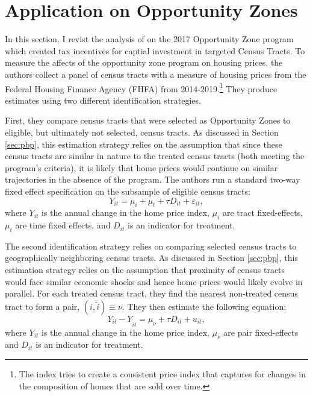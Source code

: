 \documentclass[11pt]{article}
\begin{document}
\section{Application on Opportunity Zones}\label{sec:oz}

In this section, I revist the analysis of \citet{Chen_Glaeser_Wessel_2021} on the 2017 Opportunity Zone program which created tax incentives for captial investment in targeted Census Tracts. To measure the affects of the opportunity zone program on housing prices, the authors collect a panel of census tracts with a measure of housing prices from the Federal Housing Finance Agency (FHFA) from 2014-2019.\footnote{The index tries to create a consistent price index that captures for changes in the composition of homes that are sold over time.} They produce estimates using two different identification strategies.

First, they compare census tracts that were selected as Opportunity Zones to eligible, but ultimately not selected, census tracts. As discussed in Section \ref{sec:pbp}, this estimation strategy relies on the assumption that since these census tracts are similar in nature to the treated census tracts (both meeting the program's criteria), it is likely that home prices would continue on similar trajectories in the absence of the program. The authors run a standard two-way fixed effect specification on the subsample of eligible census tracts:
\begin{equation}\label{eq:oz-eligible}
    Y_{it} = \mu_i + \mu_t + \tau D_{it} + \varepsilon_{it},
\end{equation}
where $Y_{it}$ is the annual change in the home price index, $\mu_i$ are tract fixed-effects, $\mu_t$ are time fixed effects, and $D_{it}$ is an indicator for treatment. 

The second identification strategy relies on comparing selected census tracts to geographically neighboring census tracts. As discussed in Section \ref{sec:pbp}, this estimation strategy relies on the assumption that proximity of census tracts would face similar economic shocks and hence home prices would likely evolve in parallel. For each treated census tract, they find the nearest non-treated census tract to form a pair, $(i, \tilde{i}) \equiv \nu$. They then estimate the following equation:
\begin{equation}\label{eq:oz-neighbor}
    Y_{it} - Y_{\tilde{i}t}  = \mu_\nu + \tau D_{it} + u_{it},
\end{equation}
where $Y_{it}$ is the annual change in the home price index, $\mu_\nu$ are pair fixed-effects and $D_{it}$ is an indicator for treatment. 
\end{document}
